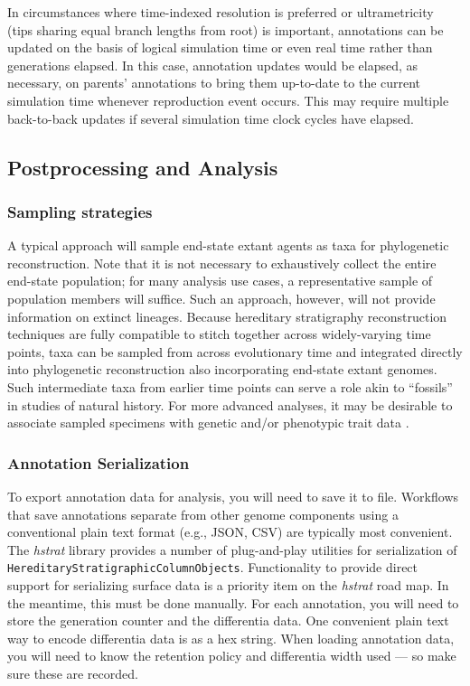 In circumstances where time-indexed resolution is preferred or ultrametricity (tips sharing equal branch lengths from root) is important, annotations can be updated on the basis of logical simulation time or even real time rather than generations elapsed.
In this case, annotation updates would be elapsed, as necessary, on parents' annotations to bring them up-to-date to the current simulation time whenever reproduction event occurs.
This may require multiple back-to-back updates if several simulation time clock cycles have elapsed.

\subsection{Postprocessing and Analysis}

\subsubsection{Sampling strategies}

A typical approach will sample end-state extant agents as taxa for phylogenetic reconstruction.
Note that it is not necessary to exhaustively collect the entire end-state population; for many analysis use cases, a representative sample of population members will suffice.
Such an approach, however, will not provide information on extinct lineages.
Because hereditary stratigraphy reconstruction techniques are fully compatible to stitch together across widely-varying time points, taxa can be sampled from across evolutionary time and integrated directly into phylogenetic reconstruction also incorporating end-state extant genomes.
Such intermediate taxa from earlier time points can serve a role akin to ``fossils'' in studies of natural history.
For more advanced analyses, it may be desirable to associate sampled specimens with genetic and/or phenotypic trait data \citep{dolson2019modes,TODOCITEFROMJACOB}.

\subsubsection{Annotation Serialization}

To export annotation data for analysis, you will need to save it to file.
Workflows that save annotations separate from other genome components using a conventional plain text format (e.g., JSON, CSV) are typically most convenient.
The \textit{hstrat} library provides a number of plug-and-play utilities for serialization of \texttt{HereditaryStratigraphicColumnObjects}.
Functionality to provide direct support for serializing surface data is a priority item on the \textit{hstrat} road map.
In the meantime, this must be done manually.
For each annotation, you will need to store the generation counter and the differentia data.
One convenient plain text way to encode differentia data is as a hex string.
When loading annotation data, you will need to know the retention policy and differentia width used --- so make sure these are recorded.


